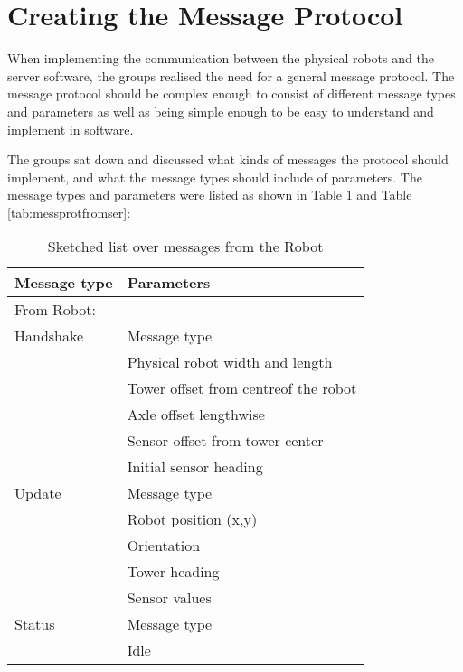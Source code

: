 \section{Creating the Message Protocol}
When implementing the communication between the physical robots and the server software, the groups realised the need for a general message protocol. The message protocol should be complex enough to consist of different message types and parameters as well as being simple enough to be easy to understand and implement in software. 

The groups sat down and discussed what kinds of messages the protocol should implement, and what the message types should include of parameters. The message types and parameters were listed as shown in Table \ref{tab:messprotfromrob} and Table \ref{tab:messprotfromser}:

\begin{table}[ht]
\begin{center}
 \begin{tabular}{|l | l|} 
 \hline
 Message type       &    Parameters \\
 \hline
 \hline
 From Robot: & \\
 \hline
 Handshake          &   Message type \\
                     &    Physical robot width and length  \\
                    &   Tower offset from centreof the robot\\
                    &    Axle offset lengthwise \\
                    &    Sensor offset from tower center \\
                    &    Initial sensor heading \\
 \hline
 Update              &   Message type \\
                    &   Robot position (x,y) \\
                    &   Orientation \\
                    &   Tower heading \\
                    &    Sensor values \\
 \hline
 Status                &   Message type \\
                     &    Idle\\
 \hline
 \end{tabular}
\end{center}
\caption{Sketched list over messages from the Robot}
\label{tab:messprotfromrob}
\end{table}

